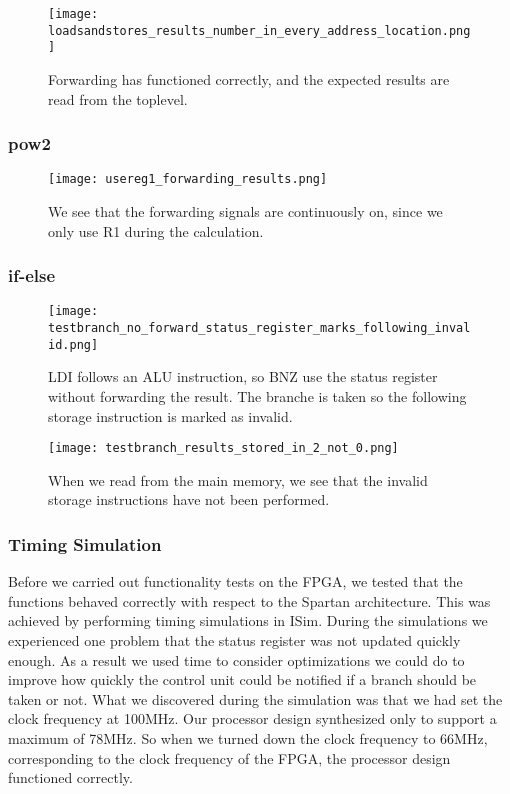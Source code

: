 \documentclass[11pt]{article}
\begin{document}
\begin{figure}[!h]
\texttt{[image: loadsandstores\_results\_number\_in\_every\_address\_location.png]}
\caption{Forwarding has functioned correctly, and the expected results are read from the toplevel.}
\label{fig:register_write}
\end{figure}

\subsubsection*{pow2}
\begin{figure}[!h]
\texttt{[image: usereg1\_forwarding\_results.png]}
\caption{We see that the forwarding signals are continuously on, since we only use R1 during the calculation.}
\label{fig:register_write}
\end{figure}

\subsubsection*{if-else}
\begin{figure}[!h]
\texttt{[image: testbranch\_no\_forward\_status\_register\_marks\_following\_invalid.png]}
\caption{LDI follows an ALU instruction, so BNZ use the status register without forwarding the result. The branche is taken so the following storage instruction is marked as invalid.}
\label{fig:register_write}
\end{figure}

\begin{figure}[!h]
\texttt{[image: testbranch\_results\_stored\_in\_2\_not\_0.png]}
\caption{When we read from the main memory, we see that the invalid storage instructions have not been performed.}
\label{fig:register_write}
\end{figure}

\subsubsection{Timing Simulation}
\label{subsubsec:timingsim}

Before we carried out functionality tests on the FPGA, we tested that
the functions behaved correctly with respect to the Spartan
architecture.  This was achieved by performing timing simulations in
ISim.  During the simulations we experienced one problem that the
status register was not updated quickly enough.  As a result we used
time to consider optimizations we could do to improve how quickly the
control unit could be notified if a branch should be taken or not.
What we discovered during the simulation was that we had set the clock
frequency at 100MHz.  Our processor design synthesized only to support
a maximum of 78MHz.  So when we turned down the clock frequency to
66MHz, corresponding to the clock frequency of the FPGA, the processor
design functioned correctly.
\end{document}
